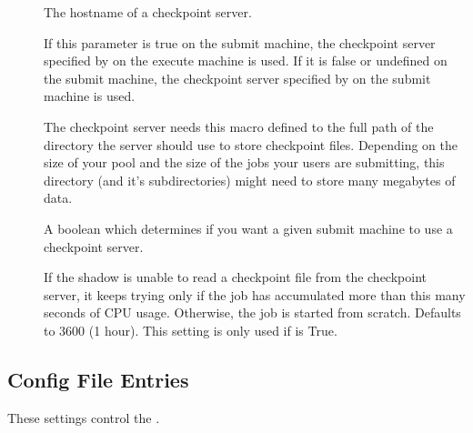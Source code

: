 \begin{description}
  
\item[] \label{param:CkptServerHost} The
  hostname of a checkpoint server.

\item[]
  \label{param:StarterChoosesCkptServer} If this parameter is true on
  the submit machine, the checkpoint server specified by
   on the execute machine is used.  If it is
  false or undefined on the submit machine, the checkpoint server
  specified by  on the submit machine is
  used.
  
\item[] \label{param:CkptServerDir} The
  checkpoint server needs this macro defined to the full path of the
  directory the server should use to store checkpoint files.
  Depending on the size of your pool and the size of the jobs your
  users are submitting, this directory (and it's subdirectories) might
  need to store many megabytes of data.

\item[] \label{param:UseCkptServer} A boolean
  which determines if you want a given submit machine to use a
  checkpoint server.

\item[]
  \label{param:MaxDiscardedRunTime} If the shadow is unable to read a
  checkpoint file from the checkpoint server, it keeps trying only if
  the job has accumulated more than this many seconds of CPU usage.
  Otherwise, the job is started from scratch.  Defaults to 3600 (1
  hour). This setting is only used if  is
  True.

\end{description}


\subsection{ Config File Entries}
\label{sec:Master-Config-File-Entries}

These settings control the .

